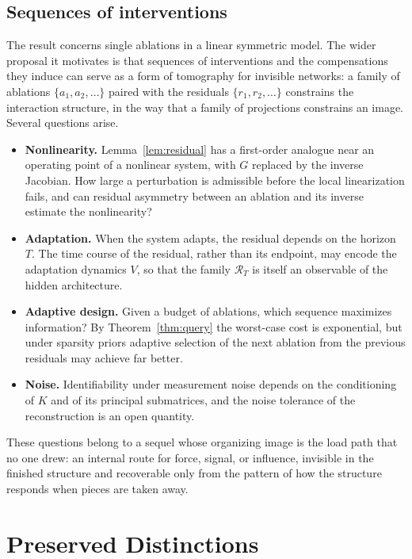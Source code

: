 \documentclass[11pt]{article}
\theoremstyle{definition}
\theoremstyle{remark}
\newcommand{\Rop}{\mathcal{R}}
\begin{document}
\subsection{Sequences of interventions}

The result concerns single ablations in a linear symmetric model. The wider proposal it motivates is that sequences of interventions and the compensations they induce can serve as a form of tomography for invisible networks: a family of ablations $\{a_1,a_2,\dots\}$ paired with the residuals $\{r_1,r_2,\dots\}$ constrains the interaction structure, in the way that a family of projections constrains an image. Several questions arise.

\begin{itemize}[leftmargin=1.4em]
\item \textbf{Nonlinearity.} Lemma~\ref{lem:residual} has a first-order analogue near an operating point of a nonlinear system, with $G$ replaced by the inverse Jacobian. How large a perturbation is admissible before the local linearization fails, and can residual asymmetry between an ablation and its inverse estimate the nonlinearity?
\item \textbf{Adaptation.} When the system adapts, the residual depends on the horizon $T$. The time course of the residual, rather than its endpoint, may encode the adaptation dynamics $V$, so that the family $\Rop_T$ is itself an observable of the hidden architecture.
\item \textbf{Adaptive design.} Given a budget of ablations, which sequence maximizes information? By Theorem~\ref{thm:query} the worst-case cost is exponential, but under sparsity priors adaptive selection of the next ablation from the previous residuals may achieve far better.
\item \textbf{Noise.} Identifiability under measurement noise depends on the conditioning of $K$ and of its principal submatrices, and the noise tolerance of the reconstruction is an open quantity.
\end{itemize}

These questions belong to a sequel whose organizing image is the load path that no one drew: an internal route for force, signal, or influence, invisible in the finished structure and recoverable only from the pattern of how the structure responds when pieces are taken away.

\section{Preserved Distinctions}\label{sec:principle}
\end{document}
